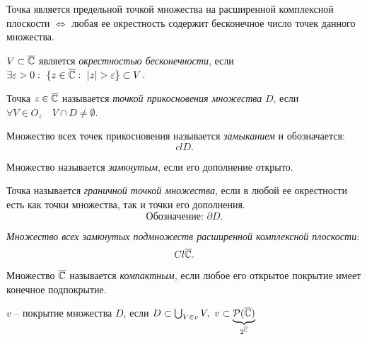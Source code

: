 \begin{remark}
    Точка является предельной точкой множества на расширенной комплексной плоскости $ \iff $ любая ее окрестность содержит бесконечное число точек данного множества.
\end{remark}

\begin{definition}
    $ V \subset \overline{\mathbb{C}} $ является \emph{окрестностью бесконечности}, если $ \exists \varepsilon > 0 : \ \{z \in \overline{\mathbb{C}} : \ | z | > \varepsilon \} \subset V $.
\end{definition}

\begin{definition}
    Точка $ z \in \overline{\mathbb{C}} $ называется \emph{точкой прикосновения множества} $ D $, если $ \forall V \in O_z \quad V \cap D \ne \emptyset $.

    Множество всех точек прикосновения называется \emph{замыканием} и обозначается:
    \[
        cl D.
    \]
\end{definition}

\begin{definition}
    Множество называется \emph{замкнутым}, если его дополнение открыто.
\end{definition}

\begin{definition}
    Точка называется \emph{граничной точкой множества}, если в любой ее окрестности есть как точки множества, так и точки его дополнения.
    \[
        \text{Обозначение: } \partial D.
    \]
\end{definition}

\begin{note}
    \emph{Множество всех замкнутых подмножеств расширенной комплексной плоскости}:
    \[
        Cl \overline{\mathbb{C}}.
    \]
\end{note}

\begin{definition}
    Множество $ \overline{\mathbb{C}} $ называется \emph{компактным}, если любое его открытое покрытие имеет конечное подпокрытие.
\end{definition}

\begin{note}
    $ v $ -- покрытие множества $ D $, если $ D \subset \bigcup_{V \in v}V, \ v \subset \underbrace{\mathcal{P}(\overline{\mathbb{C}})}_{2^{\overline{\mathbb{C}}}} $
\end{note}

